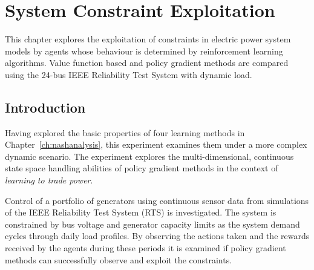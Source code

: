 
\chapter{System Constraint Exploitation}
\label{ch:exploitation}
This chapter explores the exploitation of constraints in electric power
system models by agents whose behaviour is determined by reinforcement learning
algorithms.  Value function based and policy gradient methods are compared
using the 24-bus IEEE Reliability Test System with dynamic load.

\section{Introduction}
Having explored the basic properties of four learning methods in
Chapter~\ref{ch:nashanalysis}, this experiment examines them under a
more complex dynamic scenario.  The experiment explores the multi-dimensional,
continuous state space handling abilities of policy gradient methods in the
context of \textit{learning to trade power}.

Control of a portfolio of generators using continuous sensor data from
simulations of the IEEE Reliability Test System (RTS) \cite{ieee79rts} is
investigated.  The system is constrained by bus voltage and generator capacity
limits as the system demand cycles through daily load profiles. By
observing the actions taken and the rewards received by the agents during these
periods it is examined if policy gradient methods can successfully observe and
exploit the constraints.

